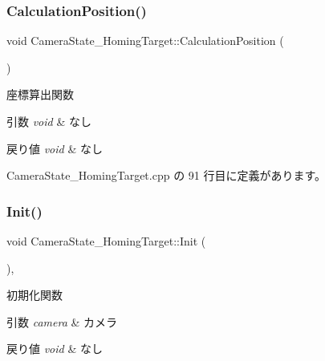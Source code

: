\subsubsection{\texorpdfstring{Calculation\+Position()}{CalculationPosition()}}
{\footnotesize\ttfamily void Camera\+State\+\_\+\+Homing\+Target\+::\+Calculation\+Position (\begin{DoxyParamCaption}{ }\end{DoxyParamCaption})\hspace{0.3cm}{\ttfamily [private]}}



座標算出関数 


\begin{DoxyParams}{引数}
{\em void} & なし \\
\hline
\end{DoxyParams}

\begin{DoxyRetVals}{戻り値}
{\em void} & なし \\
\hline
\end{DoxyRetVals}


 Camera\+State\+\_\+\+Homing\+Target.\+cpp の 91 行目に定義があります。

\mbox{\label{class_camera_state___homing_target_aaf95e93c2036a280bbc0a6a9a7df6b37}} 
\subsubsection{\texorpdfstring{Init()}{Init()}}
{\footnotesize\ttfamily void Camera\+State\+\_\+\+Homing\+Target\+::\+Init (\begin{DoxyParamCaption}{ }\end{DoxyParamCaption})\hspace{0.3cm}{\ttfamily [override]}, {\ttfamily [virtual]}}



初期化関数 


\begin{DoxyParams}{引数}
{\em camera} & カメラ \\
\hline
\end{DoxyParams}

\begin{DoxyRetVals}{戻り値}
{\em void} & なし \\
\hline
\end{DoxyRetVals}


